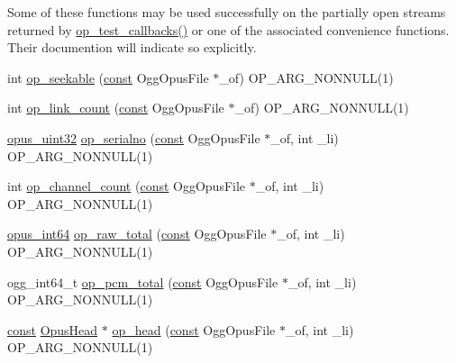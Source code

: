 Some of these functions may be used successfully on the partially open streams returned by \hyperlink{group__stream__open__close_gafe0e84414bbd1b511b494b5c5cef3c0f}{op\+\_\+test\+\_\+callbacks()} or one of the associated convenience functions. Their documention will indicate so explicitly. \begin{DoxyCompactItemize}
\item 
int \hyperlink{group__stream__info_ga9272a4a6ac9e01fbc549008f5ff58b4c}{op\+\_\+seekable} (\hyperlink{zconf_8h_a2c212835823e3c54a8ab6d95c652660e}{const} Ogg\+Opus\+File $\ast$\+\_\+of) O\+P\+\_\+\+A\+R\+G\+\_\+\+N\+O\+N\+N\+U\+LL(1)
\item 
int \hyperlink{group__stream__info_gaaf6ff40725a8bc7e73c9d396ab91837d}{op\+\_\+link\+\_\+count} (\hyperlink{zconf_8h_a2c212835823e3c54a8ab6d95c652660e}{const} Ogg\+Opus\+File $\ast$\+\_\+of) O\+P\+\_\+\+A\+R\+G\+\_\+\+N\+O\+N\+N\+U\+LL(1)
\item 
\hyperlink{opus__types_8h_a643eaaadb9ef6cd44308e0299d8cd8ce}{opus\+\_\+uint32} \hyperlink{group__stream__info_ga41992ce6f066e07609e5fe2ccd961f40}{op\+\_\+serialno} (\hyperlink{zconf_8h_a2c212835823e3c54a8ab6d95c652660e}{const} Ogg\+Opus\+File $\ast$\+\_\+of, int \+\_\+li) O\+P\+\_\+\+A\+R\+G\+\_\+\+N\+O\+N\+N\+U\+LL(1)
\item 
int \hyperlink{group__stream__info_ga42c829e67c0ce8359bfbfc31a45c04f4}{op\+\_\+channel\+\_\+count} (\hyperlink{zconf_8h_a2c212835823e3c54a8ab6d95c652660e}{const} Ogg\+Opus\+File $\ast$\+\_\+of, int \+\_\+li) O\+P\+\_\+\+A\+R\+G\+\_\+\+N\+O\+N\+N\+U\+LL(1)
\item 
\hyperlink{opus__types_8h_ab6742070cf9d0ccffca2b80522b4f41a}{opus\+\_\+int64} \hyperlink{group__stream__info_gaa433bdeab96315d315269b60ba52b877}{op\+\_\+raw\+\_\+total} (\hyperlink{zconf_8h_a2c212835823e3c54a8ab6d95c652660e}{const} Ogg\+Opus\+File $\ast$\+\_\+of, int \+\_\+li) O\+P\+\_\+\+A\+R\+G\+\_\+\+N\+O\+N\+N\+U\+LL(1)
\item 
ogg\+\_\+int64\+\_\+t \hyperlink{group__stream__info_ga8c228c3d95f2c903ad6cfd2b78d8dad6}{op\+\_\+pcm\+\_\+total} (\hyperlink{zconf_8h_a2c212835823e3c54a8ab6d95c652660e}{const} Ogg\+Opus\+File $\ast$\+\_\+of, int \+\_\+li) O\+P\+\_\+\+A\+R\+G\+\_\+\+N\+O\+N\+N\+U\+LL(1)
\item 
\hyperlink{zconf_8h_a2c212835823e3c54a8ab6d95c652660e}{const} \hyperlink{struct_opus_head}{Opus\+Head} $\ast$ \hyperlink{group__stream__info_gabae95dfa8a278a305213332e295443bb}{op\+\_\+head} (\hyperlink{zconf_8h_a2c212835823e3c54a8ab6d95c652660e}{const} Ogg\+Opus\+File $\ast$\+\_\+of, int \+\_\+li) O\+P\+\_\+\+A\+R\+G\+\_\+\+N\+O\+N\+N\+U\+LL(1)

\end{DoxyCompactItemize}
